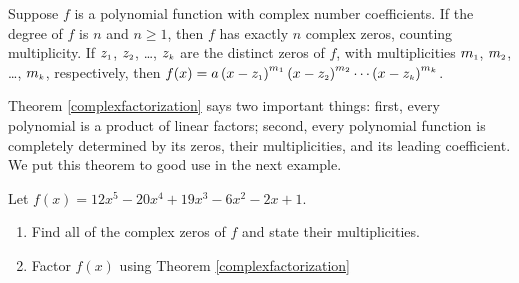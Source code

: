 \documentclass{ximera}
\begin{document}
\begin{theorem} 
    \label{complexfactorization}
    Suppose $f$ is a polynomial function with complex number coefficients.  If the degree of $f$ is $n$ and $n \geq 1$, then  $f$ has exactly $n$ complex zeros, counting multiplicity.  If 
    $z_{\mbox{\tiny $1$}}$, $z_{\mbox{\tiny $2$}}$, \ldots, $z_{\mbox{\tiny $k$}}$ 
    are the distinct zeros of $f$, with multiplicities $m_{\mbox{\tiny $1$}}$, $m_{\mbox{\tiny $2$}}$, \ldots, $m_{\mbox{\tiny $k$}}$, respectively, then 
    $f(x) = a\left(x - z_{\mbox{\tiny $1$}}  \right)^{m_{\mbox{\tiny $1$}}}\left(x - z_{\mbox{\tiny $2$}}  \right)^{m_{\mbox{\tiny $2$}}} \cdots \left(x - z_{\mbox{\tiny $k$}}  \right)^{m_{\mbox{\tiny $k$}}}$. 
\end{theorem}


Theorem \ref{complexfactorization} says two important things:  first, every polynomial is a product of linear factors;  second, every polynomial function is completely determined by its zeros, their multiplicities, and its leading coefficient.  We put this theorem to good use in the next example.

\begin{example}  
    Let $f(x) = 12x^5 - 20x^4+19x^3-6x^2-2x+1$.
    \begin{enumerate}
        \item Find all of the complex zeros of $f$ and state their multiplicities.  
        \item  Factor $f(x)$ using Theorem \ref{complexfactorization}
    \end{enumerate}
\end{example}
\end{document}
